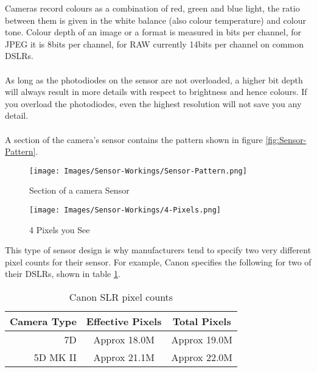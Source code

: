 Cameras record colours as a combination of red, green and blue light, the ratio between them is given in the white balance (also colour temperature) and colour tone. Colour depth of an image or a format is measured in bits per channel, for \gls{JPEG} it is 8bits per channel, for \gls{RAW} currently 14bits per channel on common \glspl{DSLR}.
\\
\\
As long as the photodiodes on the \gls{sensor} are not overloaded, a higher bit depth will always result in more details with respect to brightness and hence colours. If you overload the photodiodes, even the highest resolution will not save you any detail.
\\
\\
A section of the camera's \gls{sensor} contains the pattern shown in figure \ref{fig:Sensor-Pattern}.

\begin{figure}[htb]
\begin{minipage}{.5\textwidth}
\centering
		\texttt{[image: Images/Sensor-Workings/Sensor-Pattern.png]}
	\caption{Section of a camera Sensor}
	\label{fig:Sensor-Pattern}
\end{minipage}
\begin{minipage}{.5\textwidth}
\centering
		\texttt{[image: Images/Sensor-Workings/4-Pixels.png]}
	\caption{4 Pixels you See}
	\label{fig:4-Pixels}
\end{minipage}
\end{figure}

This type of \gls{sensor} design is why manufacturers tend to specify two very different pixel counts for their sensor. For example, Canon specifies the following for two of their \glspl{DSLR}, shown in table \ref{tab:CanonSLRPixelCounts}.

\begin{table}[htb]
	\centering
		\begin{tabular}{|r|cc|}
		\hline
		Camera Type & Effective Pixels & Total Pixels \\
		\hline
		7D & Approx 18.0M & Approx 19.0M \\
		5D MK II & Approx 21.1M & Approx 22.0M\\
		\hline	
		\end{tabular}
	\caption{Canon SLR pixel counts}
	\label{tab:CanonSLRPixelCounts}
\end{table}

